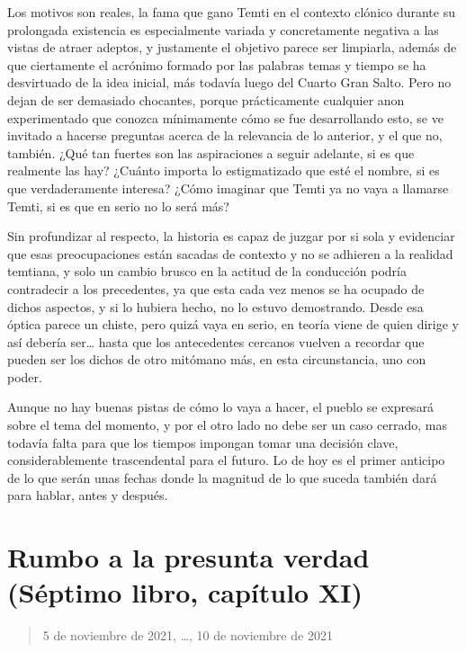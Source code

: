 \documentclass[
]{book}
\begin{document}
Los motivos son reales, la fama que gano Temti en el contexto clónico durante su prolongada existencia es especialmente variada y concretamente negativa a las vistas de atraer adeptos, y justamente el objetivo parece ser limpiarla, además de que ciertamente el acrónimo formado por las palabras temas y tiempo se ha desvirtuado de la idea inicial, más todavía luego del Cuarto Gran Salto. Pero no dejan de ser demasiado chocantes, porque prácticamente cualquier anon experimentado que conozca mínimamente cómo se fue desarrollando esto, se ve invitado a hacerse preguntas acerca de la relevancia de lo anterior, y el que no, también. ¿Qué tan fuertes son las aspiraciones a seguir adelante, si es que realmente las hay? ¿Cuánto importa lo estigmatizado que esté el nombre, si es que verdaderamente interesa? ¿Cómo imaginar que Temti ya no vaya a llamarse Temti, si es que en serio no lo será más?

Sin profundizar al respecto, la historia es capaz de juzgar por si sola y evidenciar que esas preocupaciones están sacadas de contexto y no se adhieren a la realidad temtiana, y solo un cambio brusco en la actitud de la conducción podría contradecir a los precedentes, ya que esta cada vez menos se ha ocupado de dichos aspectos, y si lo hubiera hecho, no lo estuvo demostrando. Desde esa óptica parece un chiste, pero quizá vaya en serio, en teoría viene de quien dirige y así debería ser\ldots{} hasta que los antecedentes cercanos vuelven a recordar que pueden ser los dichos de otro mitómano más, en esta circunstancia, uno con poder.

Aunque no hay buenas pistas de cómo lo vaya a hacer, el pueblo se expresará sobre el tema del momento, y por el otro lado no debe ser un caso cerrado, mas todavía falta para que los tiempos impongan tomar una decisión clave, considerablemente trascendental para el futuro. Lo de hoy es el primer anticipo de lo que serán unas fechas donde la magnitud de lo que suceda también dará para hablar, antes y después.

\hypertarget{rumbo-a-la-presunta-verdad-suxe9ptimo-libro-capuxedtulo-xi}{%
\section{Rumbo a la presunta verdad (Séptimo libro, capítulo XI)}\label{rumbo-a-la-presunta-verdad-suxe9ptimo-libro-capuxedtulo-xi}}

\begin{quote}
5 de noviembre de 2021, \ldots, 10 de noviembre de 2021
\end{quote}
\end{document}
